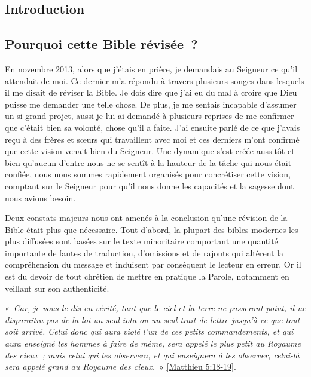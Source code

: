 \begin{center}{\LARGE \section*{Introduction}}\end{center}
\begin{small}
\subsection*{Pourquoi cette Bible révisée~?}

En novembre 2013, alors que j'étais en prière, je demandais au Seigneur ce qu'il attendait de moi. Ce dernier m'a répondu à travers plusieurs songes dans lesquels il me disait de réviser la Bible. Je dois dire que j'ai eu du mal à croire que Dieu puisse me demander une telle chose. De plus, je me sentais incapable d'assumer un si grand projet, aussi je lui ai demandé à plusieurs reprises de me confirmer que c'était bien sa volonté, chose qu'il a faite. J'ai ensuite parlé de ce que j'avais reçu à des frères et sœurs qui travaillent avec moi et ces derniers m'ont confirmé que cette vision venait bien du Seigneur. Une dynamique s'est créée aussitôt et bien qu'aucun d'entre nous ne se sentît à la hauteur de la tâche qui nous était confiée, nous nous sommes rapidement organisés pour concrétiser cette vision, comptant sur le Seigneur pour qu'il nous donne les capacités et la sagesse dont nous avions besoin. 

Deux constats majeurs nous ont amenés à la conclusion qu'une révision de la Bible était plus que nécessaire. Tout d'abord, la plupart des bibles modernes les plus diffusées sont basées sur le texte minoritaire comportant une quantité importante de fautes de traduction, d'omissions et de rajouts qui altèrent la compréhension du message et induisent par conséquent le lecteur en erreur. Or il est du devoir de tout chrétien de mettre en pratique la Parole, notamment en veillant sur son authenticité.

«~\emph{Car, je vous le dis en vérité, tant que le ciel et la terre ne passeront point, il ne disparaîtra pas de la loi un seul iota ou un seul trait de lettre jusqu'à ce que tout soit arrivé. Celui donc qui aura violé l'un de ces petits commandements, et qui aura enseigné les hommes à faire de même, sera appelé le plus petit au Royaume des cieux~; mais celui qui les observera, et qui enseignera à les observer, celui-là sera appelé grand au Royaume des cieux.}~» \vref{Matthieu 5:18-19}.


\end{small}
